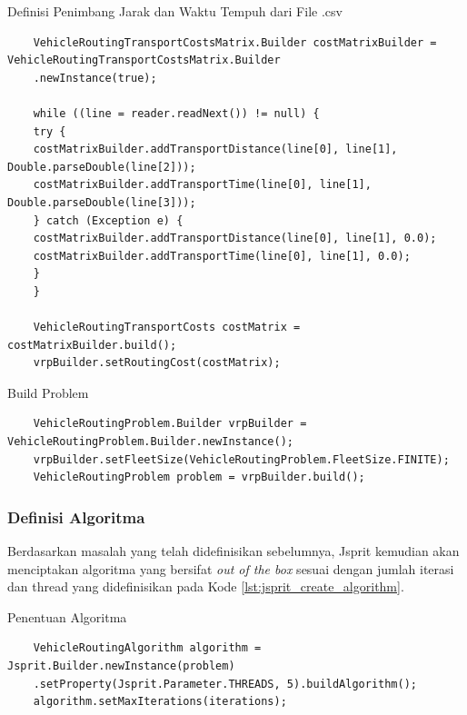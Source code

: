 \begin{listing}[!]
	\caption{Definisi Penimbang Jarak dan Waktu Tempuh dari File .csv}
	\label{lst:jsprit_define_route_weights}
	\begin{verbatim}
	VehicleRoutingTransportCostsMatrix.Builder costMatrixBuilder = VehicleRoutingTransportCostsMatrix.Builder
	.newInstance(true);
	
	while ((line = reader.readNext()) != null) {
	try {
	costMatrixBuilder.addTransportDistance(line[0], line[1], Double.parseDouble(line[2]));
	costMatrixBuilder.addTransportTime(line[0], line[1], Double.parseDouble(line[3]));
	} catch (Exception e) {
	costMatrixBuilder.addTransportDistance(line[0], line[1], 0.0);
	costMatrixBuilder.addTransportTime(line[0], line[1], 0.0);
	}
	}
	
	VehicleRoutingTransportCosts costMatrix = costMatrixBuilder.build();
	vrpBuilder.setRoutingCost(costMatrix);
	\end{verbatim}
\end{listing}


\begin{listing}[!]
	\caption{Build Problem}
	\label{lst:jsprit_build_problem}
	\begin{verbatim}
	VehicleRoutingProblem.Builder vrpBuilder = VehicleRoutingProblem.Builder.newInstance();
	vrpBuilder.setFleetSize(VehicleRoutingProblem.FleetSize.FINITE);
	VehicleRoutingProblem problem = vrpBuilder.build();
	\end{verbatim}
\end{listing}


\subsubsection{Definisi Algoritma}
Berdasarkan masalah yang telah didefinisikan sebelumnya, Jsprit kemudian akan menciptakan algoritma yang bersifat \textit{out of the box} sesuai dengan jumlah iterasi dan thread yang didefinisikan pada Kode \ref{lst:jsprit_create_algorithm}. 


\begin{listing}[!]
	\caption{Penentuan Algoritma}
	\label{lst:jsprit_create_algorithm}
	\begin{verbatim}
	VehicleRoutingAlgorithm algorithm = Jsprit.Builder.newInstance(problem)
	.setProperty(Jsprit.Parameter.THREADS, 5).buildAlgorithm();
	algorithm.setMaxIterations(iterations);
	\end{verbatim}
\end{listing}


